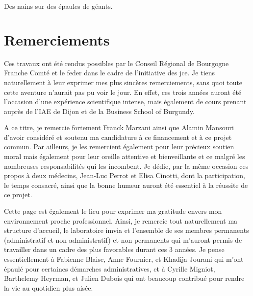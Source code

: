 \documentclass[english,standardlists]{spimubphdthesis}
\begin{document}
\dominitoc



	\parbox[t]{\textwidth}{
	\vspace{1.5cm}
		\begin{fquote}
			Des nains sur des épaules de géants.
		\end{fquote}	
	}
	
\chapter*{Remerciements}
Ces travaux ont été rendus possibles par le Conseil Régional de Bourgogne Franche Comté et le \gls{feder} dans le cadre de l'initiative des \gls{jce}. Je tiens naturellement à leur exprimer mes plus sincères remerciements, sans quoi toute cette aventure n'aurait pas pu voir le jour. En effet, ces trois années auront été l'occasion d'une expérience scientifique intense, mais également de cours prenant auprès de l'IAE de Dijon et de la Business School of Burgundy.\par

A ce titre, je remercie fortement Franck Marzani ainsi que Alamin Mansouri d'avoir considéré et soutenu ma candidature à ce financement et à ce projet commun. Par ailleurs, je les remercient également pour leur précieux soutien moral mais également pour leur oreille attentive et bienveillante et ce malgré les nombreuses responsabilités qui les incombent. Je dédie, par la même occasion ces propos à deux médecins, Jean-Luc Perrot et Elisa Cinotti, dont la participation, le temps consacré, ainsi que la bonne humeur auront été essentiel à la réussite de ce projet.\par

Cette page est également le lieu pour exprimer ma gratitude envers mon environnement proche professionnel. Ainsi, je remercie tout naturellement ma structure d'accueil, le laboratoire \gls{imvia} et l'ensemble de ses membres permanents (administratif et non administratif) et non permanents qui m'auront permis de travailler dans un cadre des plus favorables durant ces 3 années. Je pense essentiellement à Fabienne Blaise, Anne Fournier, et Khadija Jourani qui m'ont épaulé pour certaines démarches administratives, et à Cyrille Migniot, Barthelemy Heyrman, et Julien Dubois qui ont beaucoup contribué pour rendre la vie au quotidien plus aisée.\par
\end{document}
